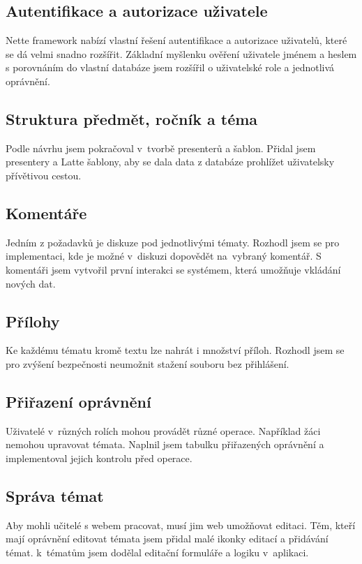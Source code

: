 \documentclass[thesis=B,czech]{FITthesis}[2012/06/26]
\begin{document}
\subsection{Autentifikace a autorizace uživatele}

Nette framework nabízí vlastní řešení autentifikace a autorizace uživatelů, které se dá velmi snadno rozšířit. Základní myšlenku ověření uživatele jménem a heslem s porovnáním do vlastní databáze jsem rozšířil o uživatelské role a jednotlivá oprávnění.

\subsection{Struktura předmět, ročník a téma}

Podle návrhu jsem pokračoval v~tvorbě presenterů a šablon. Přidal jsem presentery a Latte šablony, aby se dala data z databáze prohlížet uživatelsky přívětivou cestou.

\subsection{Komentáře}

Jedním z požadavků je diskuze pod jednotlivými tématy. Rozhodl jsem se pro implementaci, kde je možné v~diskuzi dopovědět na~vybraný komentář. S komentáři jsem vytvořil první interakci se systémem, která umožňuje vkládání nových dat.

\subsection{Přílohy}

Ke každému tématu kromě textu lze nahrát i množství příloh. Rozhodl jsem se pro zvýšení bezpečnosti neumožnit stažení souboru bez přihlášení.

\subsection{Přiřazení oprávnění}

Uživatelé v~různých rolích mohou provádět různé operace. Například žáci nemohou upravovat témata. Naplnil jsem tabulku přiřazených oprávnění a implementoval jejich kontrolu před operace.

\subsection{Správa témat}

Aby mohli učitelé s webem pracovat, musí jim web umožňovat editaci. Těm, kteří mají oprávnění editovat témata jsem přidal malé ikonky editací a přidávání témat. k~tématům jsem dodělal editační formuláře a logiku v~aplikaci.
\end{document}
